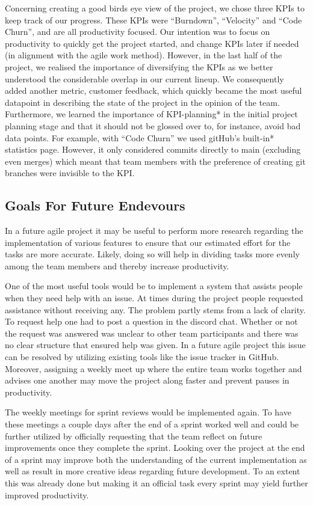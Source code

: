 Concerning creating a good birds eye view of the project, we chose three KPIs to keep track of our progress. These KPIs were “Burndown”, “Velocity” and “Code Churn”, and are all productivity focused. Our intention was to focus on productivity to quickly get the project started, and change KPIs later if needed (in alignment with the agile work method). However, in the last half of the project, we realised the importance of diversifying the KPIs as we better understood the considerable overlap in our current lineup. We consequently added another metric, customer feedback, which quickly became the most useful datapoint in describing the state of the project in the opinion of the team. Furthermore, we learned the importance of KPI-planning* in the initial project planning stage and that it should not be glossed over to, for instance, avoid bad data points. For example, with “Code Churn” we used gitHub’s built-in* statistics page. However, it only considered commits directly to main (excluding even merges) which meant that team members with the preference of creating git branches were invisible to the KPI. 


\subsection{Goals For Future Endevours}
In a future agile project it may be useful to perform more research regarding the implementation of various features to ensure that our estimated effort for the tasks are more accurate. Likely, doing so will help in dividing tasks more evenly among the team members and thereby increase productivity.

One of the most useful tools would be to implement a system that assists people when they need help with an issue. At times during the project people requested assistance without receiving any. The problem partly stems from a lack of clarity. To request help one had to post a question in the discord chat. Whether or not the request was answered was unclear to other team participants and there was no clear structure that ensured help was given. In a future agile project this issue can be resolved by utilizing existing tools like the issue tracker in GitHub. Moreover, assigning a weekly meet up where the entire team works together and advises one another may move the project along faster and prevent pauses in productivity.

The weekly meetings for sprint reviews would be implemented again. To have these meetings a couple days after the end of a sprint worked well and could be further utilized by officially requesting that the team reflect on future improvements once they complete the sprint. Looking over the project at the end of a sprint may improve both the understanding of the current implementation as well as result in more creative ideas regarding future development. To an extent this was already done but making it an official task every sprint may yield further improved productivity. 

